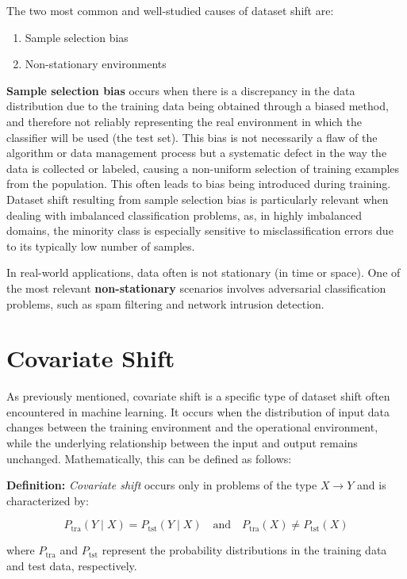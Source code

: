 The two most common and well-studied causes of dataset shift are:

\begin{enumerate}
	\item Sample selection bias
	\item Non-stationary environments
\end{enumerate}

\textbf{Sample selection bias} occurs when there is a discrepancy in the data distribution due to the training data being obtained through a biased method, and therefore not reliably representing the real environment in which the classifier will be used (the test set). This bias is not necessarily a flaw of the algorithm or data management process but a systematic defect in the way the data is collected or labeled, causing a non-uniform selection of training examples from the population. This often leads to bias being introduced during training. Dataset shift resulting from sample selection bias is particularly relevant when dealing with imbalanced classification problems, as, in highly imbalanced domains, the minority class is especially sensitive to misclassification errors due to its typically low number of samples.

In real-world applications, data often is not stationary (in time or space). One of the most relevant \textbf{non-stationary} scenarios involves adversarial classification problems, such as spam filtering and network intrusion detection.
	

\section{Covariate Shift}

As previously mentioned, covariate shift is a specific type of dataset shift often encountered in machine learning. It occurs when the distribution of input data changes between the training environment and the operational environment, while the underlying relationship between the input and output remains unchanged. Mathematically, this can be defined as follows:

\textbf{Definition:} \textit{Covariate shift} occurs only in problems of the type $X \to Y$ and is characterized by:

$$
P_{\text{tra}}(Y \mid X) = P_{\text{tst}}(Y \mid X) \quad \text{and} \quad P_{\text{tra}}(X) \neq P_{\text{tst}}(X)
$$

where $P_{\text{tra}}$ and $P_{\text{tst}}$ represent the probability distributions in the training data and test data, respectively.  

